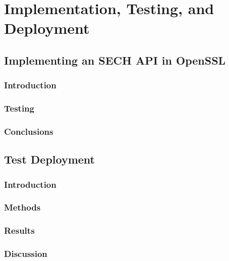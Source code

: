 \chapter{Implementation, Testing, and Deployment}

\section{Implementing an SECH API in OpenSSL}
\subsection{Introduction}
\subsection{Testing}
\subsection{Conclusions}
\section{Test Deployment}
\subsection{Introduction}
\subsection{Methods}
\subsection{Results}
\subsection{Discussion}






